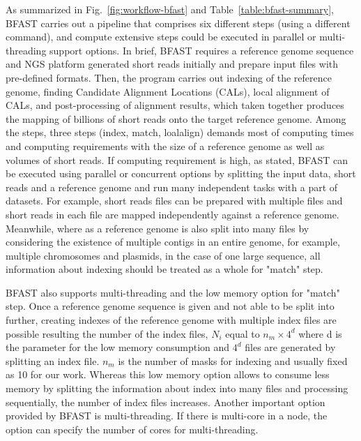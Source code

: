 \documentclass[12pt]{article}
\begin{document}
As summarized in Fig.~\ref{fig:workflow-bfast} and Table~\ref{table:bfast-summary}, BFAST carries out a pipeline that comprises six different steps (using a different command), and compute extensive steps could be executed in parallel or multi-threading support options.  In brief, BFAST requires a reference genome sequence and NGS platform generated short reads initially and prepare input files with pre-defined formats.  Then, the program carries out indexing of the reference genome, finding Candidate Alignment Locations (CALs), local alignment of CALs, and post-processing of alignment results, which taken together produces the mapping of billions of short reads onto the target reference genome.  Among the steps, three steps (index, match, loalalign) demands most of computing times and computing requirements with the size of a reference genome as well as volumes of short reads.  If computing requirement is high, as stated, BFAST can be executed using parallel or concurrent options by splitting the input data, short reads and a reference genome and run many independent tasks with a part of datasets.  For example, short reads files can be prepared with multiple files and short reads in each file are mapped independently against a reference genome.  Meanwhile, where as a reference genome is also split into many files by considering the existence of multiple contigs in an entire genome, for example, multiple chromosomes and plasmids, in the case of one large sequence, all information about indexing should be treated as a whole for "match" step. 

BFAST also supports multi-threading and the low memory option for "match" step. Once a reference genome sequence is given and not able to be split into further, creating indexes of the reference genome with multiple index files are possible resulting the number of the index files, $N_i$ equal to $n_m \times 4^d$ where d is the parameter for the low memory consumption and $4^d$ files are generated by splitting an index file.  $n_m$ is the number of masks for indexing and usually fixed as 10 for our work.  Whereas this low memory option allows to consume less memory by splitting the information about index into many files and processing sequentially, the number of index files increases.  Another important option provided by BFAST is multi-threading.  If there is multi-core in a node, the option can specify the number of cores for multi-threading.    
\end{document}
